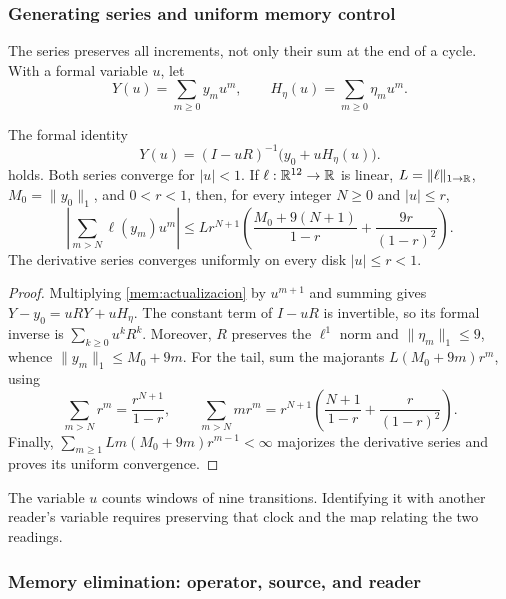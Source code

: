 \subsubsection{Generating series and uniform memory control}

The series preserves all increments, not only their sum at the end of
a cycle. With a formal variable \(u\), let
\[
 Y(u)=\sum_{m\geq0}y_mu^m,\qquad
 H_\eta(u)=\sum_{m\geq0}\eta_mu^m.
\]

\begin{proposition}
\label{mem:prop-serie}
The formal identity
\begin{equation}
 Y(u)=(I-uR)^{-1}\bigl(y_0+uH_\eta(u)\bigr).
 \label{mem:serie}
\end{equation}
holds. Both series converge for \(|u|<1\). If \(\ell:\mathbb R^{12}\to\mathbb R\)
is linear, \(L=\|\ell\|_{1\to\mathbb R}\), \(M_0=\|y_0\|_1\), and
\(0<r<1\), then, for every integer \(N\geq0\) and \(|u|\leq r\),
\begin{equation}
 \left|\sum_{m>N}\ell(y_m)u^m\right|
 \leq Lr^{N+1}\left(
 \frac{M_0+9(N+1)}{1-r}+\frac{9r}{(1-r)^2}\right).
 \label{mem:cota}
\end{equation}
The derivative series converges uniformly on every disk
\(|u|\leq r<1\).
\end{proposition}
\begin{proof}
Multiplying \eqref{mem:actualizacion} by \(u^{m+1}\) and summing gives
\(Y-y_0=uRY+uH_\eta\). The constant term of \(I-uR\) is
invertible, so its formal inverse is \(\sum_{k\geq0}u^kR^k\).
Moreover, \(R\) preserves the \(\ell^1\) norm and
\(\|\eta_m\|_1\leq9\), whence
\(\|y_m\|_1\leq M_0+9m\).
For the tail, sum the majorants
\(L(M_0+9m)r^m\), using
\[
 \sum_{m>N}r^m=\frac{r^{N+1}}{1-r},\qquad
 \sum_{m>N}mr^m=r^{N+1}
 \left(\frac{N+1}{1-r}+\frac r{(1-r)^2}\right).
\]
Finally, \(\sum_{m\geq1}Lm(M_0+9m)r^{m-1}<\infty\)
majorizes the derivative series and proves its uniform convergence.
\end{proof}

The variable \(u\) counts windows of nine transitions. Identifying it
with another reader's variable requires preserving that clock and the
map relating the two readings.

\subsubsection{Memory elimination: operator, source, and reader}

